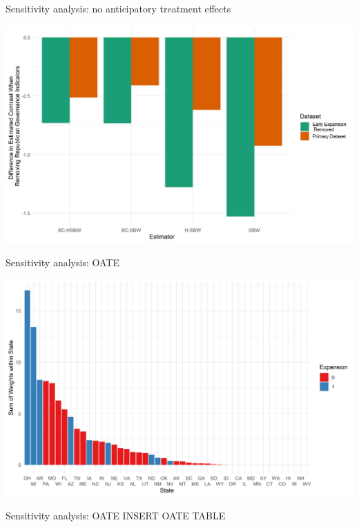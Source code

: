 \documentclass[hyperref={pdfpagelabels=false}]{beamer}
\begin{document}
\begin{frame}{Sensitivity analysis: no anticipatory treatment effects}
    \begin{center}
	\includegraphics[scale=0.5]{01_Plots/repub-diff-c1c2.png}
    \end{center}
\end{frame}

\begin{frame}{Sensitivity analysis: OATE}
    \begin{center}
	\includegraphics[scale=0.5]{01_Plots/oate-region-c1-a.png}
    \end{center}
\end{frame}

\begin{frame}{Sensitivity analysis: OATE}
INSERT OATE TABLE
\end{frame}
\end{document}
